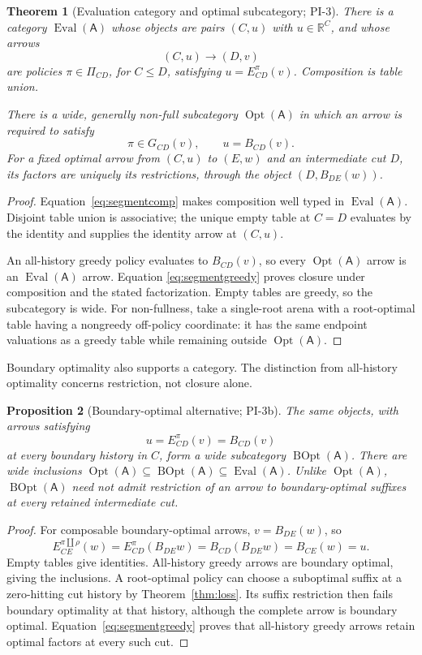 \documentclass[11pt]{article}
\newtheorem{theorem}{Theorem}[section]
\newtheorem{proposition}[theorem]{Proposition}
\theoremstyle{definition}
\newcommand{\R}{\mathbb R}
\newcommand{\A}{\mathsf A}
\newcommand{\Eval}{\operatorname{Eval}}
\newcommand{\Opt}{\operatorname{Opt}}
\newcommand{\BOpt}{\operatorname{BOpt}}
\begin{document}
\begin{theorem}[Evaluation category and optimal subcategory; PI-3]
\label{thm:categories}
There is a category \(\Eval(\A)\) whose objects are pairs \((C,u)\) with
\(u\in\R^C\), and whose arrows
\[
 (C,u)\longrightarrow(D,v)
\]
are policies \(\pi\in\Pi_{CD}\), for \(C\leq D\), satisfying
\(u=E_{CD}^{\pi}(v)\). Composition is table union.

There is a wide, generally non-full subcategory \(\Opt(\A)\) in which an
arrow is required to satisfy
\[
 \pi\in G_{CD}(v),\qquad u=B_{CD}(v).
\]
For a fixed optimal arrow from \((C,u)\) to \((E,w)\) and an intermediate cut
\(D\), its factors are uniquely its restrictions, through the object
\((D,B_{DE}(w))\).
\end{theorem}
\begin{proof}
Equation~\eqref{eq:segmentcomp} makes composition well typed in
\(\Eval(\A)\). Disjoint table union is associative; the unique empty
table at \(C=D\) evaluates by the identity and supplies the identity
arrow at \((C,u)\).

An all-history greedy policy evaluates to \(B_{CD}(v)\), so every
\(\Opt(\A)\) arrow is an \(\Eval(\A)\) arrow. Equation
\eqref{eq:segmentgreedy} proves closure under composition and the stated
factorization. Empty tables are greedy, so the subcategory is wide.
For non-fullness, take a single-root arena with a root-optimal table
having a nongreedy off-policy coordinate: it has the same endpoint
valuations as a greedy table while remaining outside \(\Opt(\A)\).
\end{proof}

Boundary optimality also supports a category. The distinction from
all-history optimality concerns restriction, not closure alone.

\begin{proposition}[Boundary-optimal alternative; PI-3b]
\label{prop:boundary}
The same objects, with arrows satisfying
\[
 u=E_{CD}^{\pi}(v)=B_{CD}(v)
\]
at every boundary history in \(C\), form a wide subcategory \(\BOpt(\A)\).
There are wide inclusions
\(\Opt(\A)\subseteq\BOpt(\A)\subseteq\Eval(\A)\).
Unlike \(\Opt(\A)\), \(\BOpt(\A)\) need not admit restriction of an arrow
to boundary-optimal suffixes at every retained intermediate cut.
\end{proposition}
\begin{proof}
For composable boundary-optimal arrows, \(v=B_{DE}(w)\), so
\[
 E_{CE}^{\pi\amalg\rho}(w)
 =E_{CD}^{\pi}(B_{DE}w)
 =B_{CD}(B_{DE}w)
 =B_{CE}(w)=u.
\]
Empty tables give identities. All-history greedy arrows are boundary
optimal, giving the inclusions.
A root-optimal policy can choose a suboptimal suffix at a zero-hitting
cut history by Theorem~\ref{thm:loss}. Its suffix restriction then fails
boundary optimality at that history, although the complete arrow is
boundary optimal. Equation~\eqref{eq:segmentgreedy} proves that
all-history greedy arrows retain optimal factors at every such cut.
\end{proof}
\end{document}
